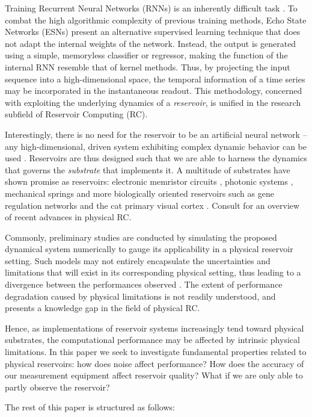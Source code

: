 Training Recurrent Neural Networks (RNNs) is an inherently difficult task
\cite{bengio_learning_1994}. To combat the high algorithmic complexity of
previous training methods, Echo State Networks (ESNs) \cite{jaeger_echo_2001}
present an alternative supervised learning technique that does not adapt the
internal weights of the network. Instead, the output is generated using a
simple, memoryless classifier or regressor, making the function of the internal
RNN resemble that of kernel methods. Thus, by projecting the input sequence into
a high-dimensional space, the temporal information of a time series may be
incorporated in the instantaneous readout. This methodology, concerned with
exploiting the underlying dynamics of a \textit{reservoir}, is unified in the
research subfield of Reservoir Computing (RC).

Interestingly, there is no need for the reservoir to be an artificial neural
network -- any high-dimensional, driven system exhibiting complex dynamic
behavior can be used \cite{schrauwen_overview_2007}. Reservoirs are thus
designed such that we are able to harness the dynamics that governs the
\textit{substrate} that implements it. A multitude of substrates have shown
promise as reservoirs: electronic memristor circuits
\cite{kulkarni_memristor-based_2012}, photonic systems
\cite{vandoorne_experimental_2014}, mechanical springs
\cite{hauser_towards_2011} and more biologically oriented reservoirs such as
gene regulation networks \cite{jones_is_2007} and the cat primary visual cortex
\cite{scholkopf_temporal_2007}. Consult \cite{tanaka_recent_2018} for an
overview of recent advances in physical RC.

Commonly, preliminary studies are conducted by simulating the proposed dynamical
system numerically to gauge its applicability in a physical reservoir
setting. Such models may not entirely encapsulate the uncertainties and
limitations that will exist in its corresponding physical setting, thus leading
to a divergence between the performances observed
\cite{vandoorne_experimental_2014, katumba_neuromorphic_2018,
jensen_reservoir_2017}. The extent of performance degradation caused by physical
limitations is not readily understood, and presents a knowledge gap in the field
of physical RC.

Hence, as implementations of reservoir systems increasingly tend toward physical
substrates, the computational performance may be affected by intrinsic physical
limitations. In this paper we seek to investigate fundamental properties related
to physical reservoirs: how does noise affect performance? How does the accuracy
of our measurement equipment affect reservoir quality? What if we are only able
to partly observe the reservoir?

The rest of this paper is structured as follows:




